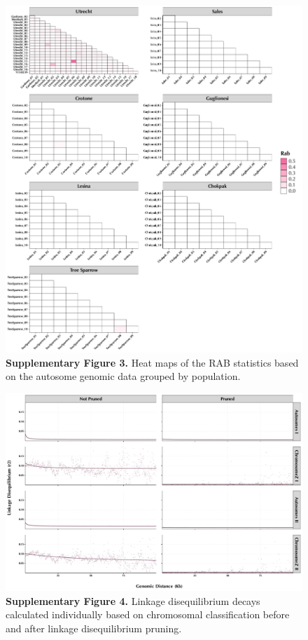 \documentclass[twoside, british, a4paper]{article}
\begin{document}
\begin{figure}
\centering
\includegraphics[width=1\textwidth]{../Y150239Genomics--Pipeline/Y150239Genomics--Plots/Y150239Genomics--Kinship/Y150239Genomics--Kinship.pdf}
\captionsetup{labelformat=empty}
\caption[\textbf{Supplementary Figure 3.}]{\textbf{Supplementary Figure 3.} Heat maps of the RAB statistics based on the autosome genomic data grouped by population.}
\label{SI:Y150239Genomics--Kinship}
\end{figure}

\begin{figure}
\centering
\includegraphics[width=1\textwidth]{../Y150239Genomics--Pipeline/Y150239Genomics--Plots/Y150239Genomics--LD/Y150239Genomics--LD.pdf}
\captionsetup{labelformat=empty}
\caption[\textbf{Supplementary Figure 4.}]{\textbf{Supplementary Figure 4.} Linkage disequilibrium decays calculated individually based on chromosomal classification before and after linkage disequilibrium pruning.}
\label{fig:Figure}
\end{figure}
\end{document}

